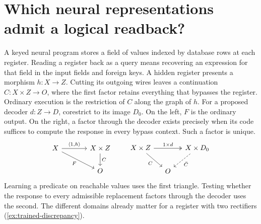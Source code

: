 \documentclass[11pt,a4paper]{article}
\theoremstyle{definition}
\theoremstyle{remark}\newaliascnt{remark}{theorem}
\numberwithin{equation}{section}
\begin{document}
\section{Which neural representations admit a logical readback?}\label{sec:intro}
A keyed neural program stores a field of values indexed by database rows at each register. Reading a register back as a query means recovering an expression for that field in the input fields and foreign keys. A hidden register presents a morphism \(h:X\to Z\). Cutting its outgoing wires leaves a continuation \(C:X\times Z\to O\), where the first factor retains everything that bypasses the register. Ordinary execution is the restriction of \(C\) along the graph of \(h\). For a proposed decoder \(d:Z\to D\), corestrict to its image \(D_0\). On the left, $F$ is the ordinary output. On the right, a factor through the decoder exists precisely when its code suffices to compute the response in every bypass context. Such a factor is unique.
\[
\begin{tikzcd}[column sep=large]
 X\arrow[r,"{\langle 1,h\rangle}"]\arrow[dr,"F"']&X\times Z\arrow[d,"C"]\\
 &O
\end{tikzcd}
\qquad
\begin{tikzcd}[column sep=small]
 X\times Z\arrow[rr,two heads,"1\times d"]\arrow[dr,"C"']&&X\times D_0\arrow[dl,dashed,"\bar C"]\\
 &O
\end{tikzcd}
\]
Learning a predicate on reachable values uses the first triangle. Testing whether the response to every admissible replacement factors through the decoder uses the second. The different domains already matter for a register with two rectifiers (\cref{ex:trained-discrepancy}).
\end{document}
